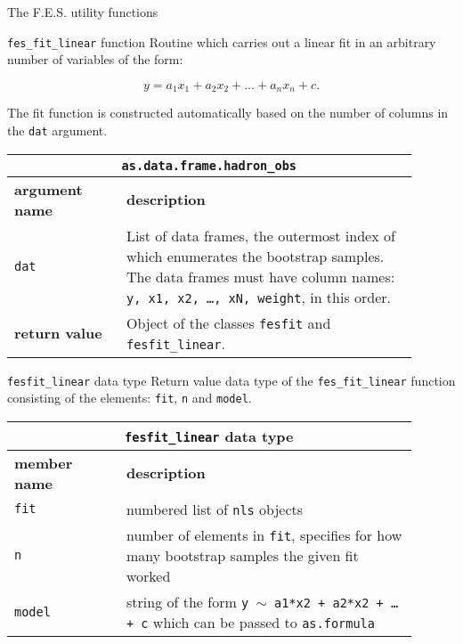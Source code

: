 \documentclass[10pt,a4paper]{article}
\begin{document}
\begin{section}{The F.E.S. utility functions}

\begin{subsection}{ {\tt fes\_fit\_linear} function }
Routine which carries out a linear fit in an arbitrary number of variables of
the form:

\begin{equation}
y=a_1 x_1 + a_2 x_2 + \ldots + a_n x_n + c.
\end{equation}

The fit function is constructed automatically based on the number of columns in
the {\tt dat} argument.

{ \centering
\begin{tabular}{|p{0.25\linewidth}|p{0.65\linewidth}|}
\hline
\multicolumn{2}{|c|}{ {\tt as.data.frame.hadron\_obs} } \\
\hline \hline \textbf{argument name} & \textbf{description} \\ \hline
{\tt dat} & List of data frames, the outermost index of which enumerates the
bootstrap samples.
The data frames must have column names: {\tt y, x1, x2, \ldots, xN, weight}, in
this order. \\
\hline 
\textbf{return value} & Object of the classes {\tt fesfit} and {\tt
fesfit\_linear}. \\
\hline
\end{tabular}
} %

\end{subsection}

\begin{subsection}{ {\tt fesfit\_linear} data type }
Return value data type of the {\tt fes\_fit\_linear} function consisting of the
elements: {\tt fit}, {\tt n} and {\tt model}.

{ \centering
\begin{tabular}{|p{0.25\linewidth}|p{0.65\linewidth}|}
\hline
\multicolumn{2}{|c|}{ {\tt fesfit\_linear} data type } \\
\hline \hline \textbf{member name} & \textbf{description} \\ \hline
{\tt fit} & numbered list of {\tt nls} objects \\ 
{\tt n}  & number of elements in {\tt fit}, specifies for how many bootstrap
samples the given fit worked \\ 
{\tt model} & string of the form {\tt y $\sim$ a1*x2 + a2*x2 + \ldots + c} which
can be passed to {\tt as.formula} \\
\hline 
\end{tabular}
} %


\end{subsection}
\end{section}
\end{document}
